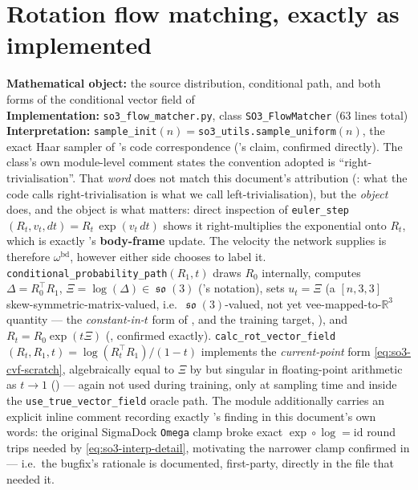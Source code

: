 \documentclass[11pt,a4paper]{report}
\theoremstyle{definition}
\theoremstyle{remark}
\DeclareMathOperator{\so}{\mathfrak{so}}
\newcommand{\RR}{\mathbb R}
\newcommand{\file}[1]{\texttt{#1}}
\newcommand{\pyfunc}[1]{\texttt{#1}}
\begin{document}
\section{Rotation flow matching, exactly as implemented}
\label{sec:sigmaflow-rotation}

\begin{codebox}
\textbf{Mathematical object:} the source distribution, conditional path,
and both forms of the conditional vector field of
 \\
\textbf{Implementation:} \file{so3\_flow\_matcher.py}, class
\pyfunc{SO3\_FlowMatcher} (63 lines total) \\
\textbf{Interpretation:}
\pyfunc{sample\_init}$(n)=$\pyfunc{so3\_utils.sample\_uniform}$(n)$, the
exact Haar sampler of 's code correspondence
('s claim, confirmed directly). The class's own
module-level comment states the convention adopted is
``right-trivialisation''. That \emph{word} does not match this document's
attribution (: what the code calls
right-trivialisation is what we call left-trivialisation), but the
\emph{object} does, and the object is what matters: direct inspection of
\pyfunc{euler\_step}$(R_t,v_t,dt)=R_t\,\exp(v_t\,dt)$ shows it
right-multiplies the exponential onto $R_t$, which is exactly
's \textbf{body-frame} update. The velocity the
network supplies is therefore $\omega^{\mathrm{bd}}$, however either side
chooses to label it.
\pyfunc{conditional\_probability\_path}$(R_1,t)$ draws $R_0$ internally,
computes $\Delta=R_0^\top R_1$, $\Xi=\log(\Delta)\in\so(3)$
('s notation), sets $u_t=\Xi$ (a $[n,3,3]$
skew-symmetric-matrix-valued, i.e.\ $\so(3)$-valued, not yet
vee-mapped-to-$\RR^3$ quantity --- the \emph{constant-in-$t$} form of
, and the training target,
), and $R_t=R_0\exp(t\Xi)$
(, confirmed exactly).
\pyfunc{calc\_rot\_vector\_field}$(R_t,R_1,t)=\log(R_t^\top R_1)/(1-t)$
implements the \emph{current-point} form
\eqref{eq:so3-cvf-scratch}, algebraically equal to $\Xi$ by
 but singular in floating-point arithmetic as
$t\to1$ () --- again not used during
training, only at sampling time and inside the
\texttt{use\_true\_vector\_field} oracle path. The module additionally
carries an explicit inline comment recording exactly
's finding in this document's own words: the
original SigmaDock \pyfunc{Omega} clamp broke exact
$\exp\circ\log=\mathrm{id}$ round trips needed by
\eqref{eq:so3-interp-detail}, motivating the narrower clamp confirmed in
 --- i.e.\ the bugfix's rationale is documented,
first-party, directly in the file that needed it.
\end{codebox}
\end{document}
